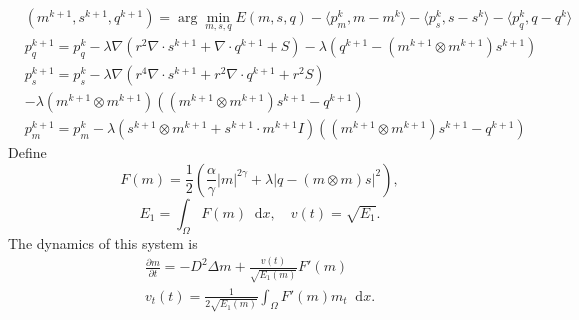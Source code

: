 \documentclass{article}
\theoremstyle{plain}
\theoremstyle{remark}
\theoremstyle{remark}
\theoremstyle{remark}
\numberwithin{equation}{section}
\newcommand*\diff{\mathop{}\!\mathrm{d}}
\begin{document}
\begin{align}
  &(m^{k+1}, s^{k+1}, q^{k+1}) = \arg\min_{m,s,q} E(m, s, q) - \langle p^k_m, m - m^k \rangle - \langle p^k_s, s - s^k \rangle - \langle p^k_q, q - q^k \rangle \\
  &p^{k+1}_q = p^k_q - \lambda \nabla (r^2\nabla\cdot s^{k+1} + \nabla\cdot q^{k+1} + S) - \lambda (q^{k+1} - (m^{k+1}\otimes m^{k+1})s^{k+1}) \\
  &p^{k+1}_s = p^k_s - \lambda \nabla (r^4\nabla\cdot s^{k+1} + r^2\nabla\cdot q^{k+1} + r^2S) \\
  & - \lambda (m^{k+1}\otimes m^{k+1})((m^{k+1}\otimes m^{k+1})s^{k+1} - q^{k+1}) \\
  &p^{k+1}_m = p^k_m - \lambda (s^{k+1}\otimes m^{k+1} + s^{k+1}\cdot m^{k+1} I)((m^{k+1}\otimes m^{k+1})s^{k+1} - q^{k+1})
\end{align}
Define
\begin{equation}
  F(m) = \frac{1}{2}(\frac{\alpha}{\gamma}|m|^{2\gamma} +  \lambda|q - (m\otimes m) s|^2),
\end{equation}
\begin{equation}
  E_1 = \int_\Omega F(m)\diff x, \quad v(t) = \sqrt{E_1}.
\end{equation}
The dynamics of this system is
\begin{align}
  \frac{\partial m}{\partial t} = -D^2\Delta m + \frac{v(t)}{\sqrt{E_1(m)}}F'(m)\\
  v_t(t) = \frac{1}{2\sqrt{E_1(m)}}\int_\Omega F'(m)m_t\diff x.
\end{align}
\end{document}
